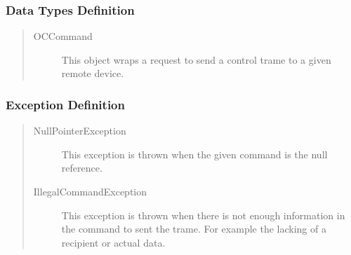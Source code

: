 \subsubsection{Data Types Definition}

\begin{quote}
	\begin{description}
		\item[OCCommand] This object wraps a request to send a control
		trame to a given remote device.
	\end{description} 
\end{quote}

\subsubsection{Exception Definition} 

\begin{quote}
	\begin{description}
		\item[NullPointerException] This exception is thrown when the given command is
		the null reference.
		\item[IllegalCommandException] This exception is thrown when there is not
		enough information in the command to sent the trame. For example the lacking
		of a recipient or actual data.
	\end{description} 
\end{quote}